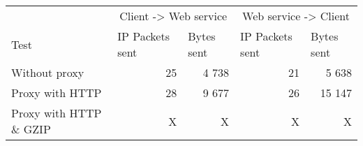 \begin{tabular}{lrrrr}
\hline
\multicolumn{1}{l}{}                  & \multicolumn{2}{c}{Client -> Web service}                           & \multicolumn{2}{c}{Web service -> Client}                           \\
\multicolumn{1}{l}{Test} & \multicolumn{1}{l}{IP Packets sent} & \multicolumn{1}{l}{Bytes sent} & \multicolumn{1}{l}{IP Packets sent} & \multicolumn{1}{l}{Bytes sent} \\ \hline
Without proxy                           & 25                                            & 4 738                                    & 21                                            & 5 638 \\
Proxy with HTTP                         & 28                                            & 9 677                                   & 26                                            & 15 147 \\
Proxy with HTTP \& GZIP                 & X                                            & X                                    & X                                            & X \\

\end{tabular}
